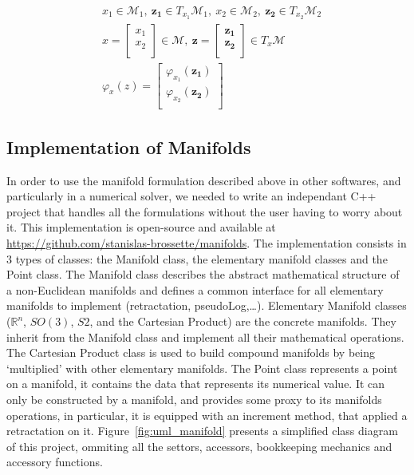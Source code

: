 \begin{align}
  &x_1\in \mathcal{M}_1,\ \mathbf{z_1}\in T_{x_1}\mathcal{M}_1,\ x_2\in \mathcal{M}_2,\ \mathbf{z_2}\in T_{x_2}\mathcal{M}_2\\
  &x=\begin{bmatrix}
    x_1\\x_2\\
  \end{bmatrix}\in \mathcal{M},\ \mathbf{z}=\begin{bmatrix}
    \mathbf{z_1}\\ \mathbf{z_2}\\
  \end{bmatrix}\in T_x\mathcal{M}\\
  &\varphi_x(z) = \begin{bmatrix}
    \varphi_{x_1}(\mathbf{z_1})\\
    \varphi_{x_2}(\mathbf{z_2})\\
  \end{bmatrix}
\end{align}


\subsection{Implementation of Manifolds}
\label{sub:implementation_of_manifolds}

In order to use the manifold formulation described above in other softwares, and particularly in a numerical solver, we needed to write an independant C++ project that handles all the formulations without the user having to worry about it.
This implementation is open-source and available at \href{https://github.com/stanislas-brossette/manifolds}{https://github.com/stanislas-brossette/manifolds}.
The implementation consists in 3 types of classes: the Manifold class, the elementary manifold classes and the Point class.
The Manifold class describes the abstract mathematical structure of a non-Euclidean manifolds and defines a common interface for all elementary manifolds to implement (retractation, pseudoLog,\ldots).
Elementary Manifold classes ($\mathbb{R}^n$, $SO(3)$, $S2$, and the Cartesian Product) are the concrete manifolds.
They inherit from the Manifold class and implement all their mathematical operations.
The Cartesian Product class is used to build compound manifolds by being `multiplied' with other elementary manifolds.
The Point class represents a point on a manifold, it contains the data that represents its numerical value.
It can only be constructed by a manifold, and provides some proxy to its manifolds operations, in particular, it is equipped with an increment method, that applied a retractation on it.
Figure~\ref{fig:uml_manifold} presents a simplified class diagram of this project, ommiting all the settors, accessors, bookkeeping mechanics and accessory functions.

